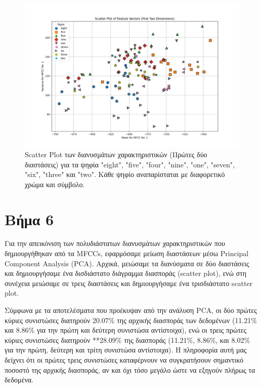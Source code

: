 \documentclass[a4paper,12pt]{article}
\begin{document}
\begin{figure}[h]
    \centering
    \includegraphics[width=\textwidth]{images/feature_vectors_scatterplot.png}
    \caption{Scatter Plot των διανυσμάτων χαρακτηριστικών (Πρώτες δύο διαστάσεις) για τα ψηφία "eight", "five", "four", "nine", "one", "seven", "six", "three" και "two". Κάθε ψηφίο αναπαρίσταται με διαφορετικό χρώμα και σύμβολο.}
    \label{fig:scatter_plot_feature_vectors}
\end{figure}

\section*{Βήμα 6}

Για την απεικόνιση των πολυδιάστατων διανυσμάτων χαρακτηριστικών που δημιουργήθηκαν από τα MFCCs, εφαρμόσαμε μείωση διαστάσεων μέσω Principal Component Analysis (PCA). Αρχικά, μειώσαμε τα διανύσματα σε δύο διαστάσεις και δημιουργήσαμε ένα δισδιάστατο διάγραμμα διασποράς (scatter plot), ενώ στη συνέχεια μειώσαμε σε τρεις διαστάσεις και δημιουργήσαμε ένα τρισδιάστατο scatter plot.

Σύμφωνα με τα αποτελέσματα που προέκυψαν από την ανάλυση PCA, 
οι δύο πρώτες κύριες συνιστώσες διατηρούν 20.07\%
της αρχικής διασποράς των δεδομένων (11.21\% και 8.86\% για την πρώτη και δεύτερη συνιστώσα αντίστοιχα), 
ενώ οι τρεις πρώτες κύριες συνιστώσες διατηρούν **28.09\% της διασποράς (11.21\%, 8.86\%, και 8.02\% για
την πρώτη, δεύτερη και τρίτη συνιστώσα αντίστοιχα). Η πληροφορία αυτή μας δείχνει ότι οι πρώτες τρεις
συνιστώσες καταφέρνουν να συγκρατήσουν σημαντικό ποσοστό της αρχικής διασποράς, αν και όχι τόσο μεγάλο ώστε να εξηγούν πλήρως τα δεδομένα.
\end{document}
